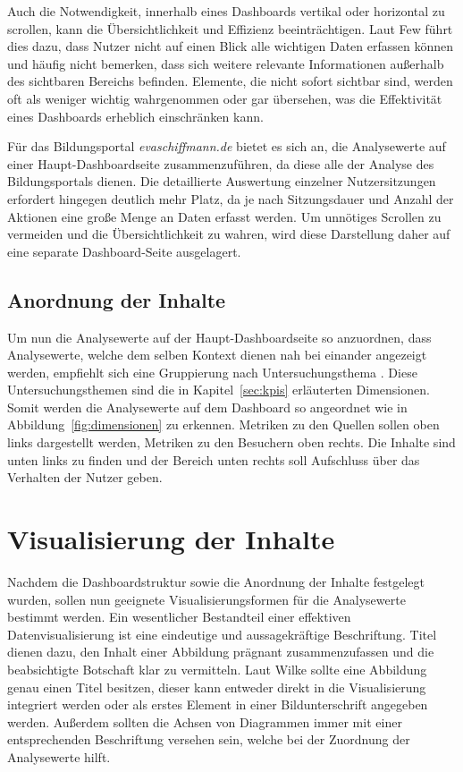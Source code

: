 Auch die Notwendigkeit, innerhalb eines Dashboards vertikal oder horizontal zu scrollen, kann die Übersichtlichkeit und Effizienz beeinträchtigen. Laut Few führt dies dazu, dass Nutzer nicht auf einen Blick alle wichtigen Daten erfassen können und häufig nicht bemerken, dass sich weitere relevante Informationen außerhalb des sichtbaren Bereichs befinden. Elemente, die nicht sofort sichtbar sind, werden oft als weniger wichtig wahrgenommen oder gar übersehen, was die Effektivität eines Dashboards erheblich einschränken kann. \parencite[Kap.3.1.1]{Few2006}

Für das Bildungsportal \textit{evaschiffmann.de} bietet es sich an, die Analysewerte auf einer Haupt-Dashboardseite zusammenzuführen, da diese alle der Analyse des Bildungsportals dienen. Die detaillierte Auswertung einzelner Nutzersitzungen erfordert hingegen deutlich mehr Platz, da je nach Sitzungsdauer und Anzahl der Aktionen eine große Menge an Daten erfasst werden. Um unnötiges Scrollen zu vermeiden und die Übersichtlichkeit zu wahren, wird diese Darstellung daher auf eine separate Dashboard-Seite ausgelagert.

\subsection{Anordnung der Inhalte}
Um nun die Analysewerte auf der Haupt-Dashboardseite so anzuordnen, dass Analysewerte, welche dem selben Kontext dienen nah bei einander angezeigt werden, empfiehlt sich eine Gruppierung nach Untersuchungsthema \parencite[Kap.14.3.1]{Hassler2019}. Diese Untersuchungsthemen sind die in Kapitel~\ref{sec:kpis} erläuterten Dimensionen. Somit werden die Analysewerte auf dem Dashboard so angeordnet wie in Abbildung~\ref{fig:dimensionen} zu erkennen. Metriken zu den Quellen sollen oben links dargestellt werden, Metriken zu den Besuchern oben rechts. Die Inhalte sind unten links zu finden und der Bereich unten rechts soll Aufschluss über das Verhalten der Nutzer geben.

\section{Visualisierung der Inhalte}
\label{sec:Visualisierungsmethoden}
Nachdem die Dashboardstruktur sowie die Anordnung der Inhalte festgelegt wurden, sollen nun geeignete Visualisierungsformen für die Analysewerte bestimmt werden. 
Ein wesentlicher Bestandteil einer effektiven Datenvisualisierung ist eine eindeutige und aussagekräftige Beschriftung. Titel dienen dazu, den Inhalt einer Abbildung prägnant zusammenzufassen und die beabsichtigte Botschaft klar zu vermitteln. Laut Wilke sollte eine Abbildung genau einen Titel besitzen, dieser kann entweder direkt in die Visualisierung integriert werden oder als erstes Element in einer Bildunterschrift angegeben werden. Außerdem sollten die Achsen von Diagrammen immer mit einer entsprechenden Beschriftung versehen sein, welche bei der Zuordnung der Analysewerte hilft. \parencite[Kap.22]{Wilke}

